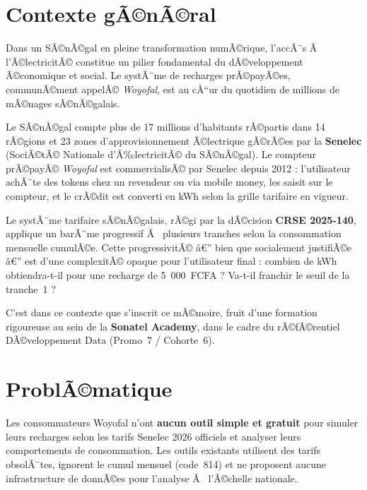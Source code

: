 \documentclass[12pt,a4paper]{report}
\begin{document}
\section{Contexte gÃ©nÃ©ral}

Dans un SÃ©nÃ©gal en pleine transformation numÃ©rique, l'accÃ¨s Ã  l'Ã©lectricitÃ© constitue un pilier fondamental du dÃ©veloppement Ã©conomique et social. Le systÃ¨me de recharges prÃ©payÃ©es, communÃ©ment appelÃ© \textit{Woyofal}, est au cÅ“ur du quotidien de millions de mÃ©nages sÃ©nÃ©galais.

Le SÃ©nÃ©gal compte plus de 17 millions d'habitants rÃ©partis dans 14 rÃ©gions et 23 zones d'approvisionnement Ã©lectrique gÃ©rÃ©es par la \textbf{Senelec} (SociÃ©tÃ© Nationale d'Ã‰lectricitÃ© du SÃ©nÃ©gal). Le compteur prÃ©payÃ© \textit{Woyofal} est commercialisÃ© par Senelec depuis 2012 : l'utilisateur achÃ¨te des tokens chez un revendeur ou via mobile money, les saisit sur le compteur, et le crÃ©dit est converti en kWh selon la grille tarifaire en vigueur.

Le systÃ¨me tarifaire sÃ©nÃ©galais, rÃ©gi par la dÃ©cision \textbf{CRSE 2025-140}, applique un barÃ¨me progressif Ã  plusieurs tranches selon la consommation mensuelle cumulÃ©e. Cette progressivitÃ© â€” bien que socialement justifiÃ©e â€” est d'une complexitÃ© opaque pour l'utilisateur final : combien de kWh obtiendra-t-il pour une recharge de 5~000~FCFA ? Va-t-il franchir le seuil de la tranche~1 ?

C'est dans ce contexte que s'inscrit ce mÃ©moire, fruit d'une formation rigoureuse au sein de la \textbf{Sonatel Academy}, dans le cadre du rÃ©fÃ©rentiel DÃ©veloppement Data (Promo~7 / Cohorte~6).

\section{ProblÃ©matique}

\begin{infobox}
Les consommateurs Woyofal n'ont \textbf{aucun outil simple et gratuit} pour simuler leurs recharges selon les tarifs Senelec 2026 officiels et analyser leurs comportements de consommation. Les outils existants utilisent des tarifs obsolÃ¨tes, ignorent le cumul mensuel (code~814) et ne proposent aucune infrastructure de donnÃ©es pour l'analyse Ã  l'Ã©chelle nationale.
\end{infobox}
\end{document}
